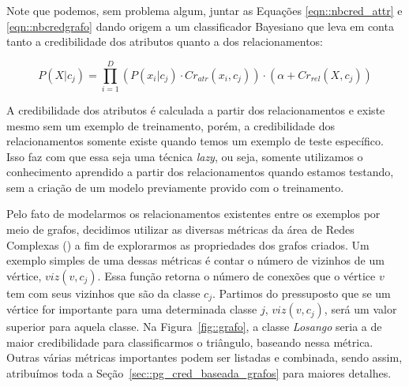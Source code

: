 

Note que podemos, sem problema algum, juntar as Equações \ref{eqn::nbcred_attr} e \ref{eqn::nbcredgrafo} dando origem a um classificador Bayesiano que leva em conta tanto a credibilidade dos atributos quanto a dos relacionamentos:

\begin{equation}\label{eqn::nbcredcompleta}
P(X|c_{j}) = \prod^{D}_{i=1}{(P(x_i|c_j) \cdot Cr_{atr}(x_i,c_j)) \cdot (\alpha + Cr_{rel}(X,c_j)) } 
\end{equation}

A credibilidade dos atributos é calculada a partir dos relacionamentos e existe mesmo sem um exemplo de treinamento, porém, a credibilidade dos relacionamentos somente existe quando temos um exemplo de teste específico. Isso faz com que essa seja uma técnica \textit{lazy}, ou seja, somente utilizamos o conhecimento aprendido a partir dos relacionamentos quando estamos testando, sem a criação de um modelo previamente provido com o treinamento. 

Pelo fato de modelarmos os relacionamentos existentes entre os exemplos por meio de grafos, decidimos utilizar as diversas métricas da área de Redes Complexas (\cite{Newman03}) a fim de explorarmos as propriedades dos grafos criados. Um exemplo simples de uma dessas métricas é contar o número de vizinhos de um vértice, $viz(v,c_j)$. Essa função retorna o número de conexões  que o vértice $v$ tem com seus vizinhos que são da classe $c_j$. Partimos do pressuposto que se um vértice for importante para uma determinada classe $j$, $viz(v,c_j)$, será um valor superior para aquela classe. Na Figura~\ref{fig::grafo}, a classe \textit{Losango} seria a de maior credibilidade para classificarmos o triângulo, baseando nessa métrica. Outras várias métricas importantes podem ser listadas e combinada, sendo assim, atribuímos toda a Seção~\ref{sec::pg_cred_baseada_grafos} para maiores detalhes.  


